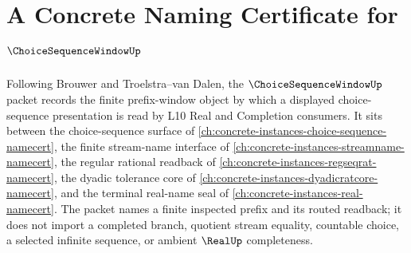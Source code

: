\chapter{A Concrete Naming Certificate for $\ChoiceSequenceWindowUp$}
\label{ch:concrete-instances-choice-sequence-window-namecert}

Following Brouwer and Troelstra--van Dalen, the $\ChoiceSequenceWindowUp$ packet records the finite prefix-window object by which a displayed choice-sequence presentation is read by L10 Real and Completion consumers. It sits between the choice-sequence surface of \autoref{ch:concrete-instances-choice-sequence-namecert}, the finite stream-name interface of \autoref{ch:concrete-instances-streamname-namecert}, the regular rational readback of \autoref{ch:concrete-instances-regseqrat-namecert}, the dyadic tolerance core of \autoref{ch:concrete-instances-dyadicratcore-namecert}, and the terminal real-name seal of \autoref{ch:concrete-instances-real-namecert}. The packet names a finite inspected prefix and its routed readback; it does not import a completed branch, quotient stream equality, countable choice, a selected infinite sequence, or ambient $\RealUp$ completeness.

